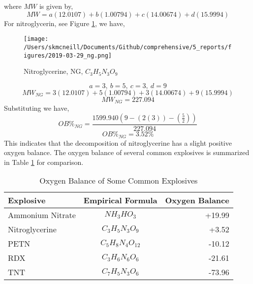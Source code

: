 where $MW$ is given by,
\begin{equation}\label{eq:ob2}
MW = a(12.0107)+b(1.00794)+c(14.00674)+d(15.9994)
\end{equation}
For nitroglycerin, see Figure \ref{fig:ng}, we have,
\begin{figure}
  \begin{center}
   \texttt{[image: /Users/skmcneill/Documents/Github/comprehensive/5\_reports/figures/2019-03-29\_ng.png]}
  \end{center}
  \caption{Nitroglycerine, NG, $C_3H_5N_3O_9$}
\label{fig:ng}
\end{figure}%
\begin{equation}\label{eq:ng1}
a = 3,\:b = 5,\:c = 3,\:d = 9
\end{equation}
\begin{equation}\label{eq:ng2}
MW_{NG} = 3(12.0107)+5(1.00794)+3(14.00674)+9(15.9994)
\end{equation}
\begin{equation}\label{eq:ng3}
MW_{NG} = 227.094
\end{equation}
Substituting we have,
\begin{equation}\label{eq:ng4}
OB\%_{NG} = \frac{1599.940\left(9-\left(2(3)\right)-\left(\frac{5}{2}\right)\right)}{227.094}
\end{equation}
\begin{equation}\label{eq:ng4}
OB\%_{NG} = 3.52\%
\end{equation}
This indicates that the decomposition of nitroglycerine has a slight positive oxygen balance.  The oxygen balance of several common explosives is summarized in Table \ref{t1} for comparison.
\begin{table}[!h]
\centering
\begin{tabular}{|l|c|r|}
\hline
Explosive        & Empirical Formula     & Oxygen Balance \\
\hline \hline
Ammonium Nitrate & $NH_3HO_3$            & +19.99         \\
\hline
Nitroglycerine   & $C_3H_5N_3O_9$      & +3.52          \\
\hline
PETN             & $C_5H_8N_4O_{12}$ & -10.12         \\
\hline
RDX              & $C_3H_6N_6O_6$      & -21.61         \\
\hline
TNT              & $C_7H_5N_3O_6$      & -73.96         \\
\hline
\end{tabular}
\caption{Oxygen Balance of Some Common Explosives}
\label{t1}
\end{table}


